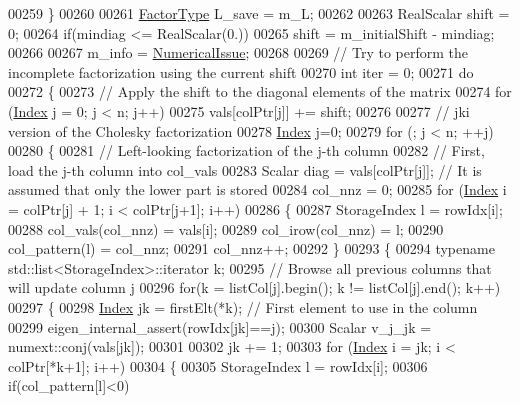 \begin{DoxyCode}
00259   \}
00260 
00261   \hyperlink{group___sparse_core___module}{FactorType} L\_save = m\_L;
00262   
00263   RealScalar shift = 0;
00264   \textcolor{keywordflow}{if}(mindiag <= RealScalar(0.))
00265     shift = m\_initialShift - mindiag;
00266 
00267   m\_info = \hyperlink{group__enums_gga85fad7b87587764e5cf6b513a9e0ee5eaaf9b736d310a664e7729d163a035cc5f}{NumericalIssue};
00268 
00269   \textcolor{comment}{// Try to perform the incomplete factorization using the current shift}
00270   \textcolor{keywordtype}{int} iter = 0;
00271   \textcolor{keywordflow}{do}
00272   \{
00273     \textcolor{comment}{// Apply the shift to the diagonal elements of the matrix}
00274     \textcolor{keywordflow}{for} (\hyperlink{namespace_eigen_a62e77e0933482dafde8fe197d9a2cfde}{Index} j = 0; j < n; j++)
00275       vals[colPtr[j]] += shift;
00276 
00277     \textcolor{comment}{// jki version of the Cholesky factorization}
00278     \hyperlink{namespace_eigen_a62e77e0933482dafde8fe197d9a2cfde}{Index} j=0;
00279     \textcolor{keywordflow}{for} (; j < n; ++j)
00280     \{
00281       \textcolor{comment}{// Left-looking factorization of the j-th column}
00282       \textcolor{comment}{// First, load the j-th column into col\_vals}
00283       Scalar diag = vals[colPtr[j]];  \textcolor{comment}{// It is assumed that only the lower part is stored}
00284       col\_nnz = 0;
00285       \textcolor{keywordflow}{for} (\hyperlink{namespace_eigen_a62e77e0933482dafde8fe197d9a2cfde}{Index} i = colPtr[j] + 1; i < colPtr[j+1]; i++)
00286       \{
00287         StorageIndex l = rowIdx[i];
00288         col\_vals(col\_nnz) = vals[i];
00289         col\_irow(col\_nnz) = l;
00290         col\_pattern(l) = col\_nnz;
00291         col\_nnz++;
00292       \}
00293       \{
00294         \textcolor{keyword}{typename} std::list<StorageIndex>::iterator k;
00295         \textcolor{comment}{// Browse all previous columns that will update column j}
00296         \textcolor{keywordflow}{for}(k = listCol[j].begin(); k != listCol[j].end(); k++)
00297         \{
00298           \hyperlink{namespace_eigen_a62e77e0933482dafde8fe197d9a2cfde}{Index} jk = firstElt(*k); \textcolor{comment}{// First element to use in the column}
00299           eigen\_internal\_assert(rowIdx[jk]==j);
00300           Scalar v\_j\_jk = numext::conj(vals[jk]);
00301 
00302           jk += 1;
00303           \textcolor{keywordflow}{for} (\hyperlink{namespace_eigen_a62e77e0933482dafde8fe197d9a2cfde}{Index} i = jk; i < colPtr[*k+1]; i++)
00304           \{
00305             StorageIndex l = rowIdx[i];
00306             \textcolor{keywordflow}{if}(col\_pattern[l]<0)

\end{DoxyCode}
